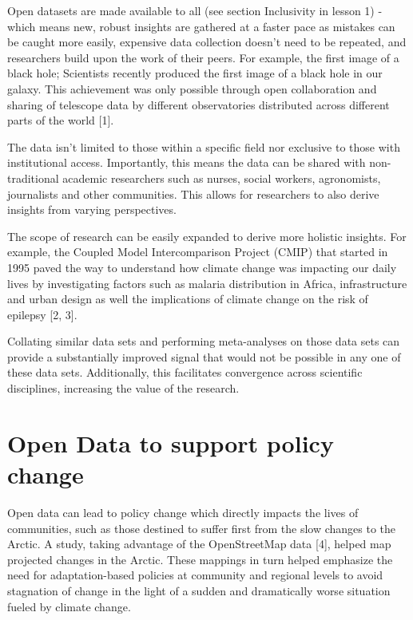\documentclass[
  letterpaper,
  DIV=11,
  numbers=noendperiod]{scrreport}
\begin{document}
Open datasets are made available to all (see section Inclusivity in
lesson 1) - which means new, robust insights are gathered at a faster
pace as mistakes can be caught more easily, expensive data collection
doesn't need to be repeated, and researchers build upon the work of
their peers. For example, the first image of a black hole; Scientists
recently produced the first image of a black hole in our galaxy. This
achievement was only possible through open collaboration and sharing of
telescope data by different observatories distributed across different
parts of the world {[}1{]}.

The data isn't limited to those within a specific field nor exclusive to
those with institutional access. Importantly, this means the data can be
shared with non-traditional academic researchers such as nurses, social
workers, agronomists, journalists and other communities. This allows for
researchers to also derive insights from varying perspectives.

The scope of research can be easily expanded to derive more holistic
insights. For example, the Coupled Model Intercomparison Project (CMIP)
that started in 1995 paved the way to understand how climate change was
impacting our daily lives by investigating factors such as malaria
distribution in Africa, infrastructure and urban design as well the
implications of climate change on the risk of epilepsy {[}2, 3{]}.

Collating similar data sets and performing meta-analyses on those data
sets can provide a substantially improved signal that would not be
possible in any one of these data sets. Additionally, this facilitates
convergence across scientific disciplines, increasing the value of the
research.

\hypertarget{open-data-to-support-policy-change}{%
\section{Open Data to support policy
change}\label{open-data-to-support-policy-change}}

Open data can lead to policy change which directly impacts the lives of
communities, such as those destined to suffer first from the slow
changes to the Arctic. A study, taking advantage of the OpenStreetMap
data {[}4{]}, helped map projected changes in the Arctic. These mappings
in turn helped emphasize the need for adaptation-based policies at
community and regional levels to avoid stagnation of change in the light
of a sudden and dramatically worse situation fueled by climate change.
\end{document}
